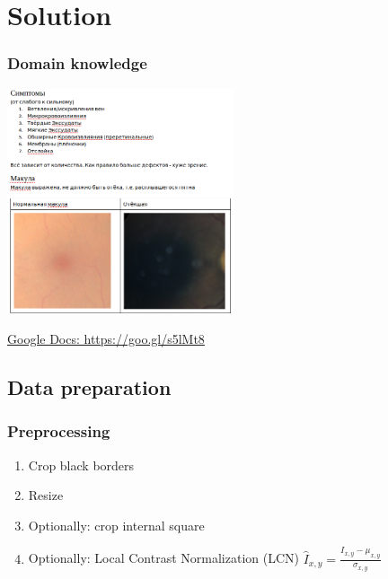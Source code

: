\documentclass{beamer}
\begin{document}
\section{Solution}

\begin{frame}\frametitle{Domain knowledge}
\par \includegraphics[interpolate=true,valign=c,width=0.5\textwidth]{pics/symptoms_pic.png}
\par \hyperlink{https://goo.gl/s5lMt8}{Google Docs: https://goo.gl/s5lMt8}
\end{frame}

\subsection{Data preparation}

\begin{frame}\frametitle{Preprocessing}

\begin{enumerate}
\item Crop black borders
\item Resize
\item Optionally: crop internal square
\item Optionally: Local Contrast Normalization (LCN) $ \hat{I}_{x,y} = \frac{I_{x,y} - \mu_{x,y}}{\sigma_{x,y}} $
\end{enumerate}

\end{frame}
\end{document}
